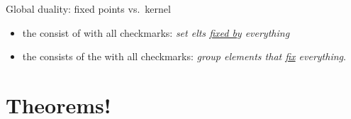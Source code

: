 \documentclass[8pt, handout]{beamer}
\newcommand{\Pause}{}      %
\begin{document}
\begin{frame}{Global duality: fixed points vs.\ kernel}
  \Pause
  
  \begin{itemize}
  \item the  consist of  with all
    checkmarks: \emph{set elts \underline{fixed by}
      everything} \smallskip\Pause
  \item the  consists of the  with all
    checkmarks: \emph{group elements that \underline{fix} everything}.
  \end{itemize}

\end{frame}


\section{Theorems!}

\end{document}
